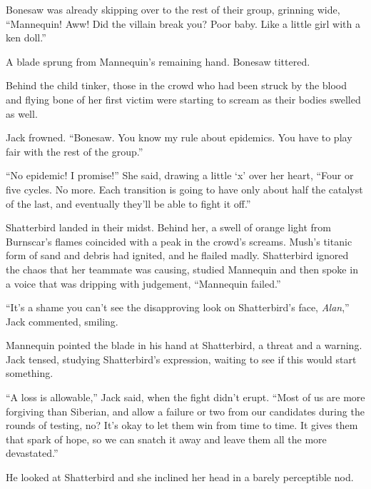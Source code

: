 Bonesaw was already skipping over to the rest of their group, grinning wide, ``Mannequin!  Aww!  Did the villain break you?  Poor baby.  Like a little girl with a ken doll.''



A blade sprung from Mannequin's remaining hand.  Bonesaw tittered.



Behind the child tinker, those in the crowd who had been struck by the blood and flying bone of her first victim were starting to scream as their bodies swelled as well.



Jack frowned.  ``Bonesaw.  You know my rule about epidemics.  You have to play fair with the rest of the group.''



``No epidemic!  I promise!''  She said, drawing a little `x' over her heart, ``Four or five cycles.  No more.  Each transition is going to have only about half the catalyst of the last, and eventually they'll be able to fight it off.''



Shatterbird landed in their midst.  Behind her, a swell of orange light from Burnscar's flames coincided with a peak in the crowd's screams.  Mush's titanic form of sand and debris had ignited, and he flailed madly.  Shatterbird ignored the chaos that her teammate was causing, studied Mannequin and then spoke in a voice that was dripping with judgement, ``Mannequin failed.''



``It's a shame you can't see the disapproving look on Shatterbird's face, \emph{Alan},'' Jack commented, smiling.



Mannequin pointed the blade in his hand at Shatterbird, a threat and a warning.  Jack tensed, studying Shatterbird's expression, waiting to see if this would start something.



``A loss is allowable,'' Jack said, when the fight didn't erupt.  ``Most of us are more forgiving than Siberian, and allow a failure or two from our candidates during the rounds of testing, no?  It's okay to let them win from time to time.  It gives them that spark of hope, so we can snatch it away and leave them all the more devastated.''



He looked at Shatterbird and she inclined her head in a barely perceptible nod.



